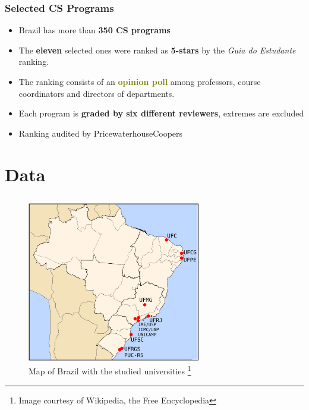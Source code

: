 \documentclass{beamer}
\begin{document}
\begin{frame}
\frametitle{Selected CS Programs}
\begin{itemize}
	\item Brazil has more than \textbf{\textcolor{n_red}{350 CS programs}}
	\item The \textbf{\textcolor{n_green}{eleven}} selected ones were ranked as 
	\textbf{\textcolor{n_violet}{5-stars}} by the \emph{Guia do
	Estudante} ranking. 
	\item The ranking consists of an \textbf{\textcolor{olive}{opinion poll}} among professors, course
	coordinators and directors of departments.
	\item Each program is \textbf{\textcolor{RawSienna}{graded by six different reviewers}}, extremes are excluded
	\item Ranking audited by PricewaterhouseCoopers
\end{itemize}
\end{frame}


\section{Data}
\subsection{}

\begin{frame}
\begin{figure}[htp]
\begin{center}
  \includegraphics[height=7cm]{brazil_map.png}
  \caption[map]{Map of Brazil with the studied universities \footnote{\tiny
  Image courtesy of Wikipedia, the Free Encyclopedia}}
\end{center}
\end{figure}

\end{frame}
\end{document}
